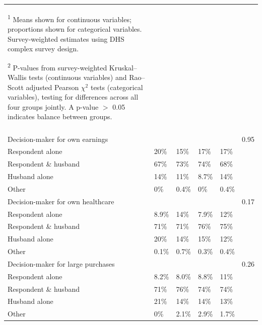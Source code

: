 \documentclass{article}
\begin{document}
\begin{landscape}
\begin{longtable}{@{}p{6cm}p{2.5cm}p{2.5cm}p{2.5cm}p{2.5cm}p{1.5cm}@{}}
{\begin{minipage}{24cm}
  \textsuperscript{1} Means shown for continuous variables; proportions shown for categorical variables.
  Survey-weighted estimates using DHS complex survey design.
  \smallskip

  \textsuperscript{2} P-values from survey-weighted Kruskal--Wallis tests (continuous variables) and
  Rao--Scott adjusted Pearson $\chi^2$ tests (categorical variables), testing for differences across
  all four groups jointly. A p-value $>$ 0.05 indicates balance between groups.
  \vspace{4pt}
  \end{minipage}%
} \\
\endlastfoot


\addlinespace[3pt]
\multicolumn{6}{l}{\textit{Panel A: Women's Decision-Making}} \\[2pt]

\quad Decision-maker for own earnings        &        &        &        &        & 0.95  \\
\quad\quad Respondent alone                  & 20\%   & 15\%   & 17\%   & 17\%   &       \\
\quad\quad Respondent \& husband             & 67\%   & 73\%   & 74\%   & 68\%   &       \\
\quad\quad Husband alone                     & 14\%   & 11\%   & 8.7\%  & 14\%   &       \\
\quad\quad Other                             & 0\%    & 0.4\%  & 0\%    & 0.4\%  &       \\[4pt]

\quad Decision-maker for own healthcare      &        &        &        &        & 0.17  \\
\quad\quad Respondent alone                  & 8.9\%  & 14\%   & 7.9\%  & 12\%   &       \\
\quad\quad Respondent \& husband             & 71\%   & 71\%   & 76\%   & 75\%   &       \\
\quad\quad Husband alone                     & 20\%   & 14\%   & 15\%   & 12\%   &       \\
\quad\quad Other                             & 0.1\%  & 0.7\%  & 0.3\%  & 0.4\%  &       \\[4pt]

\quad Decision-maker for large purchases     &        &        &        &        & 0.26  \\
\quad\quad Respondent alone                  & 8.2\%  & 8.0\%  & 8.8\%  & 11\%   &       \\
\quad\quad Respondent \& husband             & 71\%   & 76\%   & 74\%   & 74\%   &       \\
\quad\quad Husband alone                     & 21\%   & 14\%   & 14\%   & 13\%   &       \\
\quad\quad Other                             & 0\%    & 2.1\%  & 2.9\%  & 1.7\%  &       \\[4pt]


\end{longtable}
\end{landscape}
\end{document}

